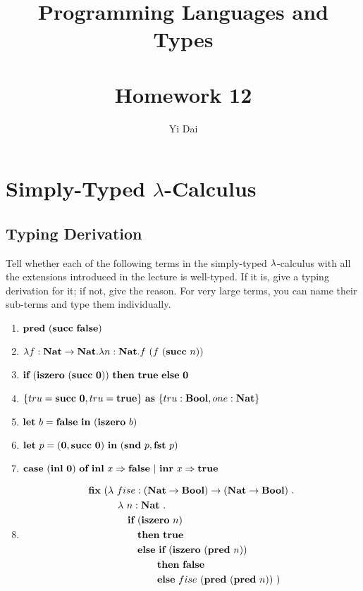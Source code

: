 \documentclass[a4paper,12pt]{article}
\title{
 Programming Languages and Types \\~\\
 \textbf{Homework 12}
}
\author{
 Yi Dai
}
\begin{document}
\maketitle

\section{Simply-Typed $\lambda$-Calculus}

\subsection{Typing Derivation}

Tell whether each of the following terms in the simply-typed $\lambda$-calculus with all the extensions 
introduced in the lecture is well-typed.  If it is, give a typing derivation for it; if not, give the
reason.  For very large terms, you can name their sub-terms and type them individually.

\begin{enumerate}
 \item $\textbf{pred}\ (\textbf{succ}\ \textbf{false})$
 \item $\lambda f : \textbf{Nat} \rightarrow \textbf{Nat} . \lambda n : \textbf{Nat} . f\ (f\ (\textbf{succ}\ n))$
 \item $\ifkw\ (\isze\ (\succ\ \zero))\ \thkw\ \true\ \elkw\ \zero$
 \item $\{tru = \succ\ \zero, tru = \true\}\ \askw\ \{tru : \BlnT, one : \NatT\}$
 \item $\letk\ b = \fals\ \inkw\ (\isze\ b)$
 \item $\letk\ p = (\zero, \succ\ \zero)\ \inkw\ (\sndp\ p, \fstp\ p)$
 \item $\textbf{case}\ (\textbf{inl}\ \textbf{0})\ \textbf{of}\ \textbf{inl}\ x \Rightarrow \textbf{false}\ |\ \textbf{inr}\ x \Rightarrow \textbf{true}$
 \item
  \begin{align*}
   \fixp\ (& \lamb\ fise : (\NatT \rarr \BlnT) \rarr (\NatT \rarr \BlnT)\ . \\
           & \quad \lamb\ n : \NatT\ . \\
           & \quad \quad \ifkw\ (\isze\ n) \\
           & \quad \quad \quad \thkw\ \true \\
           & \quad \quad \quad \elkw\ \ifkw\ (\isze\ (\pred\ n)) \\
           & \quad \quad \quad \quad \quad \thkw\ \fals \\
           & \quad \quad \quad \quad \quad \elkw\ fise\ (\pred\ (\pred\ n))\ )
  \end{align*}
\end{enumerate}
\end{document}
